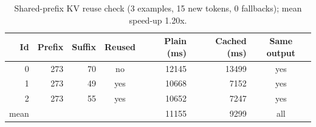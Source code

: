 \begin{table}[t]\centering\small
\caption{Shared-prefix KV reuse check (3 examples, 15 new tokens, 0 fallbacks); mean speed-up 1.20x.}\label{tab:prefix}
\begin{tabular}{rrrcrrc}
\toprule
Id & Prefix & Suffix & Reused & Plain (ms) & Cached (ms) & Same output \\
\midrule
0 & 273 & 70 & no & 12145 & 13499 & yes \\
1 & 273 & 49 & yes & 10668 & 7152 & yes \\
2 & 273 & 55 & yes & 10652 & 7247 & yes \\
\midrule
mean & & & & 11155 & 9299 & all \\
\bottomrule
\end{tabular}
\end{table}
